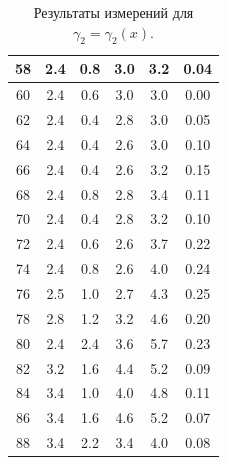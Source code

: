 \documentclass[a4paper,12pt]{article}
\begin{document}
\begin{table}[h]
\begin{tabular}{|c|c|c|c|c|c|}
58      & 2.4        & 0.8        & 3.0        & 3.2        & 0.04       \\ \hline
60      & 2.4        & 0.6        & 3.0        & 3.0        & 0.00       \\ \hline
62      & 2.4        & 0.4        & 2.8        & 3.0        & 0.05       \\ \hline
64      & 2.4        & 0.4        & 2.6        & 3.0        & 0.10       \\ \hline
66      & 2.4        & 0.4        & 2.6        & 3.2        & 0.15       \\ \hline
68      & 2.4        & 0.8        & 2.8        & 3.4        & 0.11       \\ \hline
70      & 2.4        & 0.4        & 2.8        & 3.2        & 0.10       \\ \hline
72      & 2.4        & 0.6        & 2.6        & 3.7        & 0.22       \\ \hline
74      & 2.4        & 0.8        & 2.6        & 4.0        & 0.24       \\ \hline
76      & 2.5        & 1.0        & 2.7        & 4.3        & 0.25       \\ \hline
78      & 2.8        & 1.2        & 3.2        & 4.6        & 0.20       \\ \hline
80      & 2.4        & 2.4        & 3.6        & 5.7        & 0.23       \\ \hline
82      & 3.2        & 1.6        & 4.4        & 5.2        & 0.09       \\ \hline
84      & 3.4        & 1.0        & 4.0        & 4.8        & 0.11       \\ \hline
86      & 3.4        & 1.6        & 4.6        & 5.2        & 0.07       \\ \hline
88      & 3.4        & 2.2        & 3.4        & 4.0        & 0.08       \\ \hline
\end{tabular}
\centering
\caption{Результаты измерений для $\gamma_2 = \gamma_2(x)$.}
\end{table}
\end{document}
